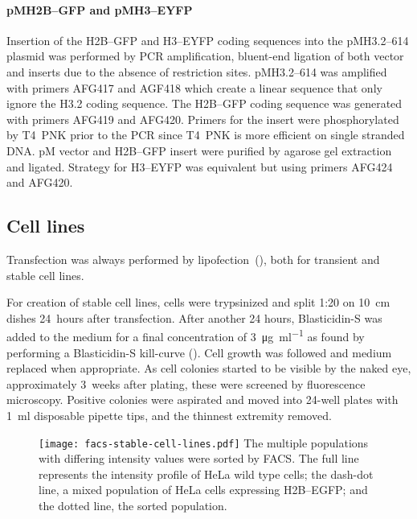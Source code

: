     \paragraph{pMH2B--GFP and pMH3--EYFP}
      Insertion of the H2B--GFP and H3--EYFP coding sequences into the
      pMH3.2--614 plasmid was performed by PCR amplification, bluent-end
      ligation of both vector and inserts due to the absence of restriction
      sites. pMH3.2--614 was amplified with primers AFG417 and AGF418 which
      create a linear sequence that only ignore the H3.2 coding sequence.
      The H2B--GFP coding sequence was generated with primers AFG419 and AFG420.
      Primers for the insert were phosphorylated by T4~PNK prior to the PCR
      since T4~PNK is more efficient on single stranded DNA. pM vector and
      H2B--GFP insert were purified by agarose gel extraction and ligated.
      Strategy for H3--EYFP was equivalent but using primers AFG424 and AFG420.

  \subsection{Cell lines}

    Transfection was always performed by lipofection~(),
    both for transient and stable cell lines.

    For creation of stable cell lines, cells were trypsinized and split
    1:20 on \SI{10}{\cm} dishes 24~hours after transfection.
    After another 24 hours, Blasticidin-S was added to the medium for
    a final concentration of \SI{3}{\ug\per\ml} as found by performing a
    Blasticidin-S kill-curve ().
    Cell growth was followed and medium replaced when appropriate.
    As cell colonies started to be visible by the naked eye, approximately
    3~weeks after plating, these were screened by fluorescence microscopy.
    Positive colonies were aspirated and moved into 24-well plates with
    \SI{1}{\ml} disposable pipette tips, and the thinnest extremity removed.

    \begin{figure}
      \centering
      \texttt{[image: facs-stable-cell-lines.pdf]}
        {
          The multiple populations with differing intensity values were
          sorted by FACS. The full line represents the intensity profile
          of HeLa wild type cells; the dash-dot line, a mixed population
          of HeLa cells expressing H2B--EGFP; and the dotted line, the
          sorted population.
        }
      \label{fig:methods:facs}
    \end{figure}

